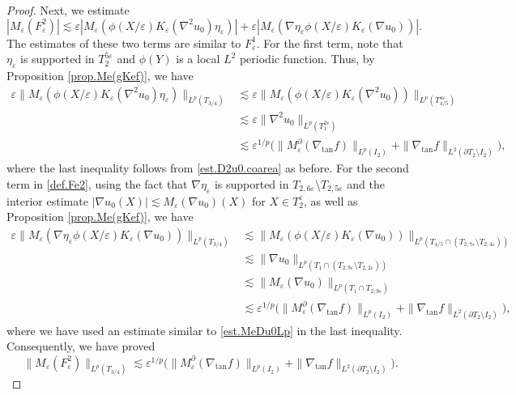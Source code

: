 \documentclass[reqno,12pt]{amsart} %
\theoremstyle{definition}
\theoremstyle{remark}
\numberwithin{equation}{section}
\newcommand{\e}{\varepsilon}
\begin{document}
\begin{proof}
Next, we estimate
\begin{equation}\label{def.Fe2}
    |M_\e(F_\e^2)| \lesssim \e |M_\e(\phi(X/\e) K_\e(\nabla^2 u_0) \eta_\e)| + \e |M_\e(\nabla \eta_\e \phi(X/\e) K_\e(\nabla u_0))|.
\end{equation}
The estimates of these two terms are similar to $F_\e^1$. For the first term, note that $\eta_\e$ is supported in $T_2^{5\e}$ and $\phi(Y)$ is a local $L^2$ periodic function. Thus, by Proposition \ref{prop.Me(gKef)},
we have
\begin{equation}\label{est.phi.KeDDu0}
\begin{aligned}
    \e \| M_\e(\phi(X/\e) K_\e(\nabla^2 u_0) \eta_\e) \|_{L^p(T_{3/4})} & \lesssim \e \| M_\e(\phi(X/\e) K_\e(\nabla^2 u_0)) \|_{L^p(T_{4/5}^{4\e})} \\
    & \lesssim \e \| \nabla^2 u_0 \|_{L^p(T_1^{2\e})} \\
    & \lesssim \e^{1/p} \big( \| M_\e^\partial(\nabla_{\tan} f) \|_{L^p(I_2)} + \| \nabla_{\tan} f \|_{L^2(\partial T_2 \setminus I_2)} \big),
\end{aligned}
\end{equation}
where the last inequality follows from  \eqref{est.D2u0.coarea} as before. For the second term in  \eqref{def.Fe2}, using the fact that $\nabla \eta_\e$ is supported in $T_{2,6\e} \setminus T_{2, 5\e}$ and the interior estimate $|\nabla u_0(X)| \lesssim M_\e(\nabla u_0)(X)$ for $X\in T_2^\e$, as well as Proposition \ref{prop.Me(gKef)}, we have
\begin{equation}\label{est.phi.KeDu0}
\begin{aligned}
    \e \| M_\e( \nabla \eta_\e \phi(X/\e) K_\e(\nabla u_0) )\|_{L^p(T_{3/4})} & \lesssim \| M_\e( \phi(X/\e) K_\e(\nabla u_0)) \|_{L^p(T_{4/5} \cap (T_{2,7\e} \setminus T_{2,4\e}))} \\
    & \lesssim \| \nabla u_0 \|_{L^p(T_{1} \cap (T_{2,9\e} \setminus T_{2,2\e}) )} \\
    & \lesssim \| M_\e(\nabla u_0) \|_{L^p(T_1 \cap T_{2,9\e})}  \\
    & \lesssim \e^{1/p} \big( \| M_\e^\partial(\nabla_{\tan} f) \|_{L^p(I_2)} + \| \nabla_{\tan} f \|_{L^2(\partial T_2 \setminus I_2)} \big),
\end{aligned}
\end{equation}
where we have used an estimate similar to \eqref{est.MeDu0Lp} in the last inequality. Consequently, we have proved
\begin{equation}\label{est.Fe2}
    \| M_\e( F_\e^2) \|_{L^p(T_{3/4})} \lesssim \e^{1/p} \big( \| M_\e^\partial(\nabla_{\tan} f) \|_{L^p(I_2)} + \| \nabla_{\tan} f \|_{L^2(\partial T_2 \setminus I_2)} \big).
\end{equation}


\end{proof}
\end{document}
